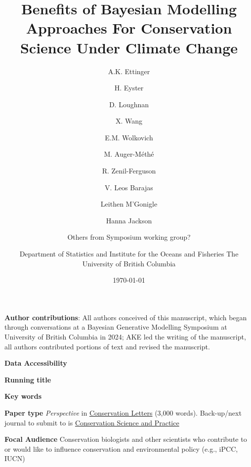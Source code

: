 \documentclass{article}
\begin{document}



\title{Benefits of Bayesian Modelling Approaches For Conservation Science Under Climate Change} 
\author[1,a]{A.K. Ettinger}
\author[2]{H. Eyster}
\author[3]{D. Loughnan}
\author[3]{X. Wang}
\author[3]{E.M. Wolkovich}
\author[4]{M. Auger-M\'eth\'e}
\author[5]{R. Zenil-Ferguson}
\author[6]{V. Leos Barajas}
\author[7]{Leithen M'Gonigle}
\author[7]{Hanna Jackson}
\author[8]{Others from Symposium working group?}


\author[4]{Department of Statistics and Institute for the Oceans and Fisheries The University of British Columbia}



\date{\today}
\maketitle 
\textbf{Author contributions}: All authors conceived of this manuscript, which began through conversations at a Bayesian Generative Modelling Symposium at University of British Columbia in 2024; AKE led the writing of the manuscript, all authors contributed portions of text and revised the manuscript.

\textbf{Data Accessibility} 

\textbf{Running title} 

\textbf{Key words} 


\textbf{Paper type} \textit{Perspective} in \href{https://conbio.onlinelibrary.wiley.com/hub/journal/1755263x/homepage/forauthors.html#ATypes}{Conservation Letters} (3,000 words). Back-up/next journal to submit to is \href{https://conbio.onlinelibrary.wiley.com/hub/journal/25784854/homepage/author-guidelines}{Conservation Science and Practice} 

\textbf{Focal Audience} Conservation biologists and other scientists who contribute to or would like to influence conservation and environmental policy (e.g., iPCC, IUCN)


\end{document}
